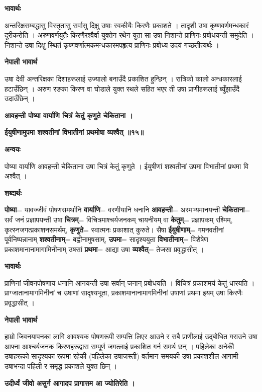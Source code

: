 \documentclass[11pt, a5paper]{article}
\begin{document}
\textbf{भावार्थः}

अन्तरिक्षसम्बद्धासु विस्तृतासु सर्वासु दिक्षु  उषाः स्वकीयैः किरणैः प्रकाशते । तादृशी उषा कृष्णवर्णमन्धकारं दूरीकरोति । अरुणवर्णयुतैः किरणैरश्वैर्वा युक्तेन रथेन युता सा उषा निशान्ते प्राणिनः प्रबोधयन्ती समुदेति । निशान्ते उषा दिक्षु स्थितं कृष्णवर्णात्मकमन्धकारमपहृत्य प्राणिनः प्रबोध्य उदयं गच्छतीत्यर्थः ।

\textbf{नेपाली भावार्थ}

उषा देवी अन्तरिक्षका दिशाहरूलाई उज्यालो बनाउँदै प्रकाशित हुन्छिन् । रात्रिको कालो अन्धकारलाई हटाउँछिन् । अरुण रङका किरण वा घोडाले युक्त रथले सहित भएर ती उषा प्राणीहरूलाई ब्युँझाउँदै उदाउँछिन् ।

\textbf{आवहन्ती पोष्या वार्याणि चित्रं केतुं कृणुते चेकिताना ।}

\textbf{ईयुषीणामुपमा शश्वतीनां विभातीनां प्रथमोषा व्यश्वैत् ॥१५॥}

\textbf{अन्वयः}

पोष्या वार्याणि आवहन्ती चेकिताना उषा चित्रं केतुं कृणुते । ईयुषीणां शश्वतीनां उपमा विभातीनां प्रथमा वि अश्वैत् ।

\textbf{शब्दार्थः}

\textbf{पोष्या}= यावज्जीवं पोषणसमर्थानि \textbf{वार्याणि}= वरणीयानि धनानि \textbf{आवहन्ती}= अस्मभ्यमानयन्ती \textbf{चेकिताना}= सर्वं जनं प्रज्ञापयन्ती उषा \textbf{चित्रम्}= विचित्रमाश्चर्यजनकम् चायनीयम् वा \textbf{केतुम्}= प्रज्ञापकम् रश्मिम्, कृत्स्नजगत्प्रकाशनसमर्थम्, \textbf{कृणुते}= स्वात्मनः प्रकाशात् कुरुते। सैषा \textbf{ईयुषीणाम्}= गमनवतीनां पूर्वनिष्पन्नानाम् \textbf{शश्वतीनाम्}= बह्वीनामुषसाम्,  \textbf{उपमा}= सादृश्ययुता \textbf{विभातीनाम्}= विशेषेण प्रकाशमानानामागामिनीनाम् उषसां \textbf{प्रथमा}= आद्या उषा \textbf{व्यश्वैत्}= तेजसा प्रवृद्धासीत् ।

\textbf{भावार्थः}

प्राणिनां जीवनपोषणाय धनानि आनयन्ती उषा सर्वान् जनान् प्रबोधयति । विचित्रं प्रकाशमयं केतुं धारयति । प्राग्जातानामागमिनीनां च उषाणां सादृश्यभूता, प्रकाशमानानामागमिनीनां उषाणां प्रथमा इयम् उषा किरणैः प्रवृद्धासीत् ।

\textbf{नेपाली भावार्थ}

हाम्रो जिवनयापनका लागि आवश्यक पोषणरूपी सम्पत्ति लिएर आउने र सबै प्राणीलाई उद्बोधित गराउने उषा आफ्ना आश्चर्यजनक किरणहरूद्वारा सम्पूर्ण जगत्लाई प्रकाशित गर्न समर्थ छन् । पहिलेका अनेकौँ उषाहरूको सादृश्यका रूपमा रहेकी (पहिलेका उषाजस्ती) वर्तमान समयकी उषा प्रकाशशील आगामी उषाभन्दा पहिली र समृद्ध प्रकाशले युक्त छिन् ।

\textbf{उदीर्ध्वं जीवो असुर्न आगादप प्रागात्तम आ ज्योतिरेति ।}
\end{document}
